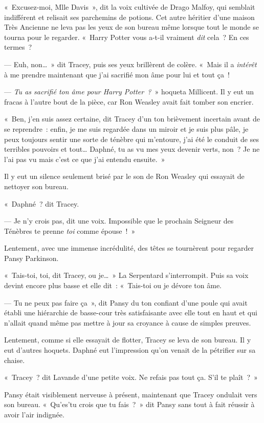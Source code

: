 «~Excusez-moi, Mlle Davis~», dit la voix cultivée de Drago Malfoy, qui semblait indifférent et relisait ses parchemins de potions. Cet autre héritier d'une maison Très Ancienne ne leva pas les yeux de son bureau même lorsque tout le monde se tourna pour le regarder. «~Harry Potter vous a-t-il vraiment \emph{dit} cela~? En ces termes~?

--- Euh, non…~» dit Tracey, puis ses yeux brillèrent de colère. «~Mais il a \emph{intérêt} à me prendre maintenant que j'ai sacrifié mon âme pour lui et tout ça~!

--- \emph{Tu as sacrifié ton âme pour Harry Potter~?}~» hoqueta Millicent. Il y eut un fracas à l'autre bout de la pièce, car Ron Weasley avait fait tomber son encrier.

«~Ben, j'en suis assez certaine, dit Tracey d'un ton brièvement incertain avant de se reprendre~: enfin, je me suis regardée dans un miroir et je suis plus pâle, je peux toujours sentir une sorte de ténèbre qui m'entoure, j'ai été le conduit de ses terribles pouvoirs et tout… Daphné, tu as vu mes yeux devenir verts, non~? Je ne l'ai pas vu mais c'est ce que j'ai entendu ensuite.~»

Il y eut un silence seulement brisé par le son de Ron Weasley qui essayait de nettoyer son bureau.

«~Daphné~? dit Tracey.

--- Je n'y crois pas, dit une voix. Impossible que le prochain Seigneur des Ténèbres te prenne \emph{toi} comme épouse~!~»

Lentement, avec une immense incrédulité, des têtes se tournèrent pour regarder Pansy Parkinson.

«~Tais-toi, toi, dit Tracey, ou je…~» La Serpentard s'interrompit. Puis sa voix devint encore plus basse et elle dit~: «~Tais-toi ou je dévore ton âme.

--- Tu ne peux pas faire ça~», dit Pansy du ton confiant d'une poule qui avait établi une hiérarchie de basse-cour très satisfaisante avec elle tout en haut et qui n'allait quand même pas mettre à jour sa croyance à cause de simples preuves.

Lentement, comme si elle essayait de flotter, Tracey se leva de son bureau. Il y eut d'autres hoquets. Daphné eut l'impression qu'on venait de la pétrifier sur sa chaise.

«~Tracey~? dit Lavande d'une petite voix. Ne refais pas tout ça. S'il te plaît~?~»

Pansy était visiblement nerveuse à présent, maintenant que Tracey ondulait vers son bureau. «~Qu'es'tu crois que tu fais~?~» dit Pansy sans tout à fait réussir à avoir l'air indignée.

